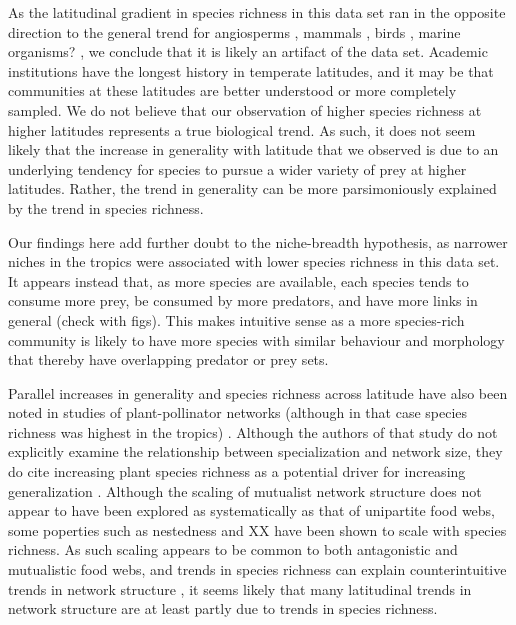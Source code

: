 \documentclass[12pt]{article}
\begin{document}
As the latitudinal gradient in species richness in this data set ran in the
opposite direction to the general trend for angiosperms \citep{}, mammals
\citep{}, birds \citep{}, marine organisms? \citep{}, we conclude that it is
likely an artifact of the data set. Academic institutions have the longest
history in temperate latitudes, and it may be that communities at these
latitudes are better understood or more completely sampled. We do not believe
that our observation of higher species richness at higher latitudes represents
a true biological trend. As such, it does not seem likely that the increase in
generality with latitude that we observed is due to an underlying tendency for
species to pursue a wider variety of prey at higher latitudes. Rather, the
trend in generality can be more parsimoniously explained by the trend in
species richness.


Our findings here add further doubt to the niche-breadth hypothesis, as
narrower niches in the tropics were associated with lower species richness in
this data set. It appears instead that, as more species are available, each
species tends to consume more prey, be consumed by more predators, and have
more links in general (check with figs). This makes intuitive sense as a more
species-rich community is likely to have more species with similar behaviour
and morphology that thereby have overlapping predator or prey sets.


Parallel increases in generality and species richness across latitude have
also been noted in studies of plant-pollinator networks (although in that case
species richness was highest in the tropics) \citep{Schleuning2012}. Although
the authors of that study do not explicitly examine the relationship between
specialization and network size, they do cite increasing plant species
richness as a potential driver for increasing generalization
\citep{Schleuning2012}. Although the scaling of mutualist network structure
does not appear to have been explored as systematically as that of unipartite
food webs, some poperties such as nestedness \citep{Vazquez2004} and XX
\citep{} have been shown to scale with species richness. As such scaling
appears to be common to both antagonistic and mutualistic food webs, and
trends in species richness can explain counterintuitive trends in network
structure \citep{Schleuning2012}, it seems likely that many latitudinal trends
in network structure are at least partly due to trends in species richness.


\end{document}
